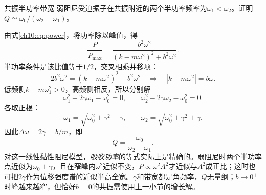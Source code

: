 \begin{origexamplebox}{共振半功率带宽}\label{ch10:ex:bandwidth}
弱阻尼受迫振子在共振附近的两个半功率频率为$\omega_1<\omega_2$。证明$Q\simeq\omega_0/(\omega_2-\omega_1)$。
\end{origexamplebox}
\begin{xesolution}
由式\eqref{ch10:eq:power}，将功率除以峰值，得
\[
 \frac{\overline P}{\overline P_{\max}}
 =\frac{b^2\omega^2}{(k-m\omega^2)^2+b^2\omega^2}.
\]
半功率条件是该比值等于$1/2$，交叉相乘并移项：
\[
 2b^2\omega^2=(k-m\omega^2)^2+b^2\omega^2
 \quad\Longrightarrow\quad|k-m\omega^2|=b\omega.
\]
低频侧$k-m\omega_1^2>0$，高频侧相反，所以分别解
\[
 \omega_1^2+2\gamma\omega_1-\omega_0^2=0,
 \qquad\omega_2^2-2\gamma\omega_2-\omega_0^2=0.
\]
各取正根：
\[
 \omega_1=\sqrt{\omega_0^2+\gamma^2}-\gamma,
 \qquad\omega_2=\sqrt{\omega_0^2+\gamma^2}+\gamma.
\]
因此$\Delta\omega=2\gamma=b/m$，即
\[
 \boxed{Q=\frac{\omega_0}{\omega_2-\omega_1}}.
\]
对这一线性黏性阻尼模型，\emph{吸收功率}的等式实际上是精确的。弱阻尼时两个半功率点近似为$\omega_0\pm\gamma$，且在窄峰内$\omega^2$近似不变，$\overline P\propto\omega^2A^2$才近似与$A^2$成正比；这时也可把$2\gamma$作为位移强度谱的近似半高全宽。$\gamma$和带宽都是角频率，$Q$无量纲；$b\to0^+$时峰越来越窄，但恰好$b=0$的共振需使用上一小节的增长解。
\end{xesolution}
